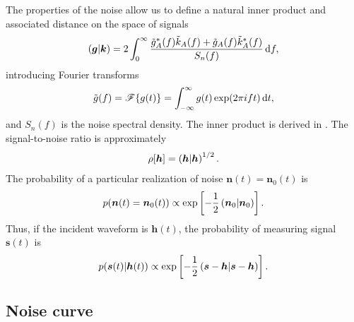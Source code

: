 The properties of the noise allow us to define a natural inner product and associated distance on the space of signals \citep{Cutler1994}
\begin{equation}
\left({\boldsymbol{g}}\middle|{\boldsymbol{k}}\right) = 2\int_{0}^{\infty}{\frac{\tilde{g}_A^\ast(f)\tilde{k}_A(f) + \tilde{g}_A(f)\tilde{k}_A^\ast(f)}{S_{n}(f)}}\,\mathrm{d}{f},
\label{eq:inner}
\end{equation}
introducing Fourier transforms
\begin{equation}
\tilde{g}(f) = \mathscr{F}\{g(t)\} = \int_{-\infty}^{\infty}{g(t)\exp(2\pi i ft)}\,\mathrm{d}{t},
\end{equation}
and $S_{n}(f)$ is the noise spectral density. The inner product is derived in . The signal-to-noise ratio is approximately
\begin{equation}
\rho[\boldsymbol{h}] = \left({\boldsymbol{h}}\middle|{\boldsymbol{h}}\right)^{1/2}.
\label{eq:SNR}
\end{equation}
The probability of a particular realization of noise $\boldsymbol{n}(t) = \boldsymbol{n}_0(t)$ is
\begin{equation}
p(\boldsymbol{n}(t) = \boldsymbol{n}_0(t)) \propto \exp\left[-\frac{1}{2}\left({\boldsymbol{n}_0}\middle|{\boldsymbol{n}_0}\right)\right].
\end{equation}
Thus, if the incident waveform is $\boldsymbol{h}(t)$, the probability of measuring signal $\boldsymbol{s}(t)$ is
\begin{equation}
p(\boldsymbol{s}(t)|\boldsymbol{h}(t)) \propto \exp\left[-\frac{1}{2}\left({\boldsymbol{s}-\boldsymbol{h}}\middle|{\boldsymbol{s}-\boldsymbol{h}}\right)\right].
\label{eq:sig_prob}
\end{equation}

\subsection{Noise curve}\label{sec:Noise}

